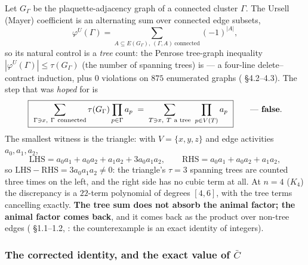 Let $G_\Gamma$ be the plaquette-adjacency graph of a connected cluster $\Gamma$. The Ursell
(Mayer) coefficient is an alternating sum over connected edge subsets,
\begin{equation}
\varphi^U(\Gamma)=\sum_{A\subseteq E(G_\Gamma),\,(\Gamma,A)\ \text{connected}}(-1)^{|A|},
\label{eq:u1-ursell}
\end{equation}
so its natural control is a \emph{tree} count: the Penrose tree-graph inequality
$|\varphi^U(\Gamma)|\le\tau(G_\Gamma)$ (the number of spanning trees) is \LT{} --- a four-line
delete--contract induction, plus $0$ violations on $875$ enumerated graphs
( \S4.2--4.3). The step that was \emph{hoped} for is
\begin{equation}
\boxed{\ \sum_{\Gamma\ni x,\ \Gamma\ \text{connected}}\tau(G_\Gamma)\prod_{p\in\Gamma}a_p
\;=\;\sum_{T\ni x,\ T\ \text{a tree}}\ \prod_{p\in V(T)}a_p\ }\qquad\text{--- \textbf{false}.}
\label{eq:u1-false-id}
\end{equation}
The smallest witness is the triangle: with $V=\{x,y,z\}$ and edge activities $a_0,a_1,a_2$,
\[
\text{LHS}=a_0a_1+a_0a_2+a_1a_2+3a_0a_1a_2,\qquad
\text{RHS}=a_0a_1+a_0a_2+a_1a_2,
\]
so $\text{LHS}-\text{RHS}=3a_0a_1a_2\ne0$: the triangle's $\tau=3$ spanning trees are counted
three times on the left, and the right side has no cubic term at all. At $n=4$ ($K_4$) the
discrepancy is a $22$-term polynomial of degrees $[4,6]$, with the tree terms cancelling exactly.
\textbf{The tree sum does not absorb the animal factor; the animal factor comes back}, and it
comes back as the product over non-tree edges ( \S1.1--1.2, \code{[T]}: the
counterexample is an exact identity of integers).

\subsubsection*{The corrected identity, and the exact value of $\bar C$}

